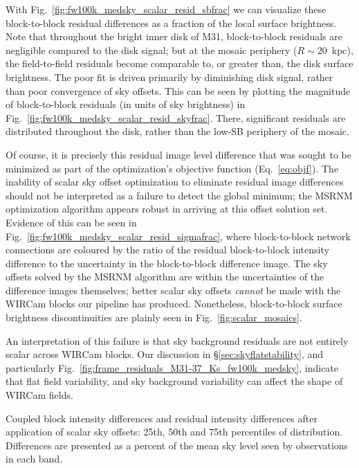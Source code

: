 \documentclass[iop]{emulateapj}
\newcommand{\Fig}[1]{Fig.~\ref{fig:#1}}  %
\newcommand{\Eq}[1]{Eq.~\ref{eq:#1}}  %
\newcommand{\Sec}[1]{\S\ref{sec:#1}}  %
\begin{document}
With \Fig{fw100k_medsky_scalar_resid_sbfrac} we can visualize these block-to-block residual differences as a fraction of the local surface brightness.
Note that throughout the bright inner disk of M31, block-to-block residuals are negligible compared to the disk signal; but at the mosaic periphery ($R\sim 20$~kpc), the field-to-field residuals become comparable to, or greater than, the disk surface brightness.
The poor fit is driven primarily by diminishing disk signal, rather than poor convergence of sky offsets.
This can be seen by plotting the magnitude of block-to-block residuals (in units of sky brightness) in \Fig{fw100k_medsky_scalar_resid_skyfrac}.
There, significant residuals are distributed throughout the disk, rather than the low-SB periphery of the mosaic.

Of course, it is precisely this residual image level difference that was sought to be minimized as part of the optimization's objective function (\Eq{objf}).
The inability of scalar sky offset optimization to eliminate residual image differences should not be interpreted as a failure to detect the global minimum; the MSRNM optimization algorithm appears robust in arriving at this offset solution set.
Evidence of this can be seen in \Fig{fw100k_medsky_scalar_resid_sigmafrac}, where block-to-block network connections are coloured by the ratio of the residual block-to-block intensity difference to the uncertainty in the block-to-block difference image.
The sky offsets solved by the MSRNM algorithm are within the uncertainties of the difference images themselves; better scalar sky offsets \emph{cannot} be made with the WIRCam blocks our pipeline has produced.
Nonetheless, block-to-block surface brightness discontinuities are plainly seen in \Fig{scalar_mosaics}.

An interpretation of this failure is that sky background residuals are not entirely scalar across WIRCam blocks.
Our discussion in \Sec{skyflatstability}, and particularly \Fig{frame_residuals_M31-37_Ks_fw100k_medsky}, indicate that flat field variability, and sky background variability can affect the shape of WIRCam fields.

\begin{table}[t]
\centering
\caption[Coupled block differences and residual differences after
scalar sky offsets]{Coupled block intensity differences and residual intensity differences after application of scalar sky offsets: 25th, 50th and 75th percentiles of distribution.
Differences are presented as a percent of the mean sky level seen by observations in each band.
}

\label{tab:fw100k_medsky_scalar_resid_diffs}
\end{table}
\end{document}
